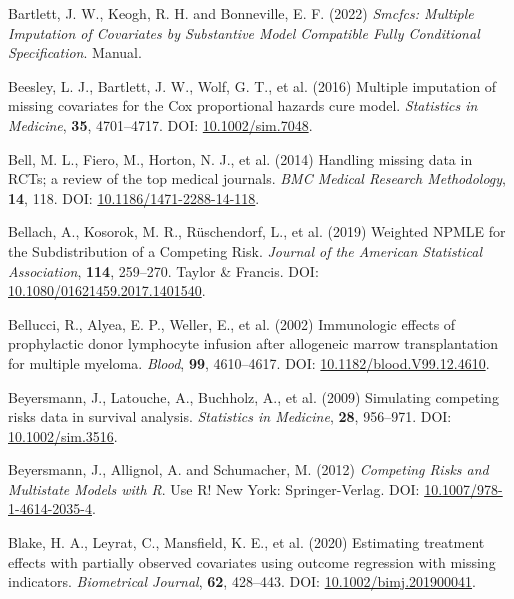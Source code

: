 \documentclass[
  letterpaper,
  paper=240mm:170mm,
  twoside=true,
  open=right,
  fontsize=10pt,
  pagesize=false,
  BCOR=15mm,
  DIV=14,
  headinclude=true,
  footinclude=false,
  headsepline=on]{scrbook}
\newlength{\cslhangindent}
\newenvironment{CSLReferences}[2] %
 {\begin{list}{}{%
  \setlength{\itemindent}{0pt}
  \setlength{\leftmargin}{0pt}
  \setlength{\parsep}{0pt}
  \ifodd #1
   \setlength{\leftmargin}{\cslhangindent}
   \setlength{\itemindent}{-1\cslhangindent}
  \fi
  \setlength{\itemsep}{#2\baselineskip}}}
 {\end{list}}
\begin{document}
\begin{CSLReferences}{1}{1}
Bartlett, J. W., Keogh, R. H. and Bonneville, E. F. (2022) \emph{Smcfcs:
{Multiple} Imputation of Covariates by Substantive Model Compatible
Fully Conditional Specification}. Manual.

Beesley, L. J., Bartlett, J. W., Wolf, G. T., et al. (2016) Multiple
imputation of missing covariates for the {Cox} proportional hazards cure
model. \emph{Statistics in Medicine}, \textbf{35}, 4701--4717. DOI:
\href{https://doi.org/10.1002/sim.7048}{10.1002/sim.7048}.

Bell, M. L., Fiero, M., Horton, N. J., et al. (2014) Handling missing
data in {RCTs}; a review of the top medical journals. \emph{BMC Medical
Research Methodology}, \textbf{14}, 118. DOI:
\href{https://doi.org/10.1186/1471-2288-14-118}{10.1186/1471-2288-14-118}.

Bellach, A., Kosorok, M. R., Rüschendorf, L., et al. (2019) Weighted
{NPMLE} for the {Subdistribution} of a {Competing Risk}. \emph{Journal
of the American Statistical Association}, \textbf{114}, 259--270. Taylor
\& Francis. DOI:
\href{https://doi.org/10.1080/01621459.2017.1401540}{10.1080/01621459.2017.1401540}.

Bellucci, R., Alyea, E. P., Weller, E., et al. (2002) Immunologic
effects of prophylactic donor lymphocyte infusion after allogeneic
marrow transplantation for multiple myeloma. \emph{Blood}, \textbf{99},
4610--4617. DOI:
\href{https://doi.org/10.1182/blood.V99.12.4610}{10.1182/blood.V99.12.4610}.

Beyersmann, J., Latouche, A., Buchholz, A., et al. (2009) Simulating
competing risks data in survival analysis. \emph{Statistics in
Medicine}, \textbf{28}, 956--971. DOI:
\href{https://doi.org/10.1002/sim.3516}{10.1002/sim.3516}.

Beyersmann, J., Allignol, A. and Schumacher, M. (2012) \emph{Competing
{Risks} and {Multistate Models} with {R}}. Use {R}! New York:
Springer-Verlag. DOI:
\href{https://doi.org/10.1007/978-1-4614-2035-4}{10.1007/978-1-4614-2035-4}.

Blake, H. A., Leyrat, C., Mansfield, K. E., et al. (2020) Estimating
treatment effects with partially observed covariates using outcome
regression with missing indicators. \emph{Biometrical Journal},
\textbf{62}, 428--443. DOI:
\href{https://doi.org/10.1002/bimj.201900041}{10.1002/bimj.201900041}.


\end{CSLReferences}
\end{document}
